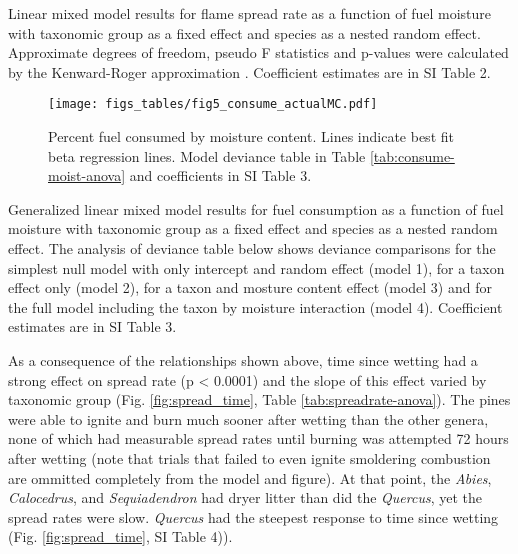 \documentclass[fire,article,submit,moreauthors,pdftex]{Definitions/mdpi}
\begin{document}
\begin{table}[H]
  \caption{Linear mixed model results for flame spread rate as a function of fuel moisture with taxonomic group as a fixed effect and species as a nested random effect. Approximate degrees of freedom, pseudo F statistics and p-values were calculated by the Kenward-Roger approximation \cite{Kenward_Roger-1997}. Coefficient estimates are in SI Table 2.}
  \label{tab:spreadrate-anova}
\centering

\end{table}



\begin{figure}[H]
  \centering
\texttt{[image: figs\_tables/fig5\_consume\_actualMC.pdf]}
\caption{Percent fuel consumed by moisture content. Lines indicate best fit beta regression lines. Model deviance table in Table \ref{tab:consume-moist-anova} and coefficients in SI Table 3.}
  \label{fig:consume-moist}
\end{figure}


\begin{table}[H]
  \caption{Generalized linear mixed model results for fuel consumption as a function of fuel moisture with taxonomic group as a fixed effect and species as a nested random effect.  The analysis of deviance table below shows deviance comparisons for the simplest null model with only intercept and random effect (model 1), for a taxon effect only (model 2), for a taxon and mosture content effect (model 3) and for the full model including the taxon by moisture interaction (model 4). Coefficient estimates are in SI Table 3.}
  \label{tab:consume-moist-anova}
\centering

\end{table}



As a consequence of the relationships shown above, time since wetting had a strong effect on spread rate (p < 0.0001) and the slope of this effect varied by taxonomic group (Fig. \ref{fig:spread_time}, Table \ref{tab:spreadrate-anova}). The pines were able to ignite and burn much sooner after wetting than the other genera, none of which had measurable spread rates until burning was attempted 72 hours after wetting (note that trials that failed to even ignite smoldering combustion are ommitted completely from the model and figure). At that point, the \emph{Abies}, \emph{Calocedrus}, and \emph{Sequiadendron} had dryer litter than did the \emph{Quercus}, yet the spread rates were slow. \emph{Quercus} had the steepest response to time since wetting (Fig. \ref{fig:spread_time}, SI Table 4)).
\end{document}
